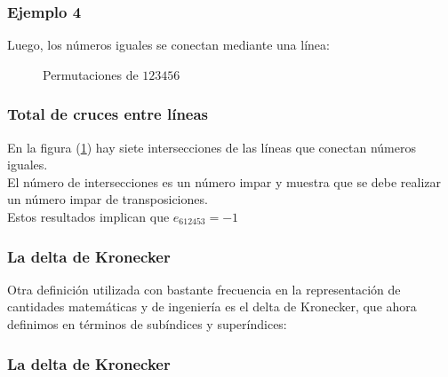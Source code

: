 \documentclass[12pt]{beamer}
\begin{document}
\begin{frame}
\frametitle{Ejemplo 4}
Luego, los números iguales se conectan mediante una línea:
\begin{figure}[H]
\centering
{}
\caption{Permutaciones de $123456$}
\label{fig:figura_01_02}
\end{figure}
\end{frame}
\begin{frame}
\frametitle{Total de cruces entre líneas}
En la figura (\ref{fig:figura_01_02}) hay siete intersecciones de las líneas que conectan números iguales.
\\
\bigskip
\pause
El número de intersecciones es un número impar y muestra que se debe realizar un número impar de transposiciones.
\\
\bigskip
\pause
Estos resultados implican que $e_{612453} = -1$
\end{frame}
\begin{frame}
\frametitle{La delta de Kronecker}
Otra definición utilizada con bastante frecuencia en la representación de cantidades matemáticas y de ingeniería es el delta de Kronecker, que ahora definimos en términos de subíndices y superíndices:
\end{frame}
\begin{frame}
\frametitle{La delta de Kronecker}
\noindent{}
\end{frame}
\end{document}
